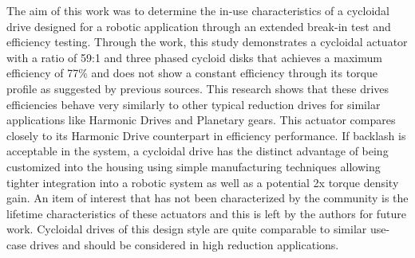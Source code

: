 The aim of this work was to determine the in-use characteristics of a cycloidal drive designed for a robotic application through an extended break-in test and efficiency testing. Through the work, this study demonstrates a cycloidal actuator with a ratio of 59:1 and three phased cycloid disks that achieves a maximum efficiency of 77\% and does not show a constant efficiency through its torque profile as suggested by previous sources.
This research shows that these drives efficiencies behave very similarly to other typical reduction drives for similar applications like Harmonic Drives and Planetary gears.
This actuator compares closely to its Harmonic Drive counterpart in efficiency performance.
If backlash is acceptable in the system, a cycloidal drive has the distinct advantage of being customized into the housing using simple manufacturing techniques allowing tighter integration into a robotic system as well as a potential 2x torque density gain.
An item of interest that has not been characterized by the community is the lifetime characteristics of these actuators and this is left by the authors for future work.
Cycloidal drives of this design style are quite comparable to similar use-case drives and should be considered in high reduction applications.
